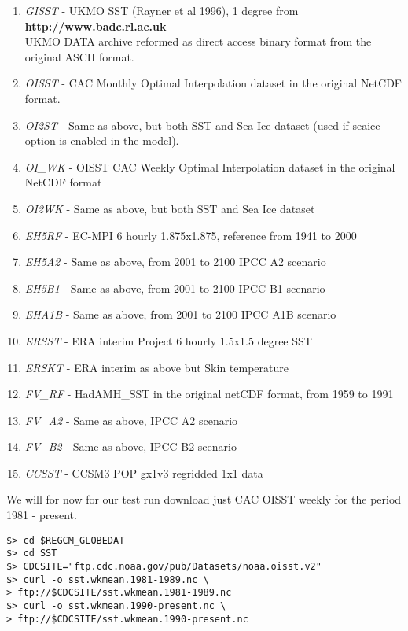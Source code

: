\begin{enumerate}
\item {\em GISST} - UKMO SST (Rayner et al 1996), 1 degree from \\
{\bf http://www.badc.rl.ac.uk} \\ UKMO DATA archive reformed as direct access
binary format from the original ASCII format.
\item {\em OISST} - CAC Monthly Optimal Interpolation dataset in the original 
NetCDF format.
\item {\em OI2ST} - Same as above, but both SST and Sea Ice dataset (used if
seaice option is enabled in the model).
\item {\em OI\_WK} - OISST CAC Weekly Optimal Interpolation dataset in the
original NetCDF format
\item {\em OI2WK} - Same as above, but both SST and Sea Ice dataset
\item {\em EH5RF} - EC-MPI 6 hourly 1.875x1.875, reference from 1941 to 2000
\item {\em EH5A2} - Same as above, from 2001 to 2100 IPCC A2 scenario
\item {\em EH5B1} - Same as above, from 2001 to 2100 IPCC B1 scenario
\item {\em EHA1B} - Same as above, from 2001 to 2100 IPCC A1B scenario
\item {\em ERSST} - ERA interim Project 6 hourly 1.5x1.5 degree SST
\item {\em ERSKT} - ERA interim as above but Skin temperature
\item {\em FV\_RF} - HadAMH\_SST in the original netCDF format, from 1959
to 1991
\item {\em FV\_A2} - Same as above, IPCC A2 scenario
\item {\em FV\_B2} - Same as above, IPCC B2 scenario 
\item {\em CCSST} - CCSM3 POP gx1v3 regridded 1x1 data
\end{enumerate}

We will for now for our test run download just CAC OISST weekly for the
period 1981 - present.

\begin{Verbatim}
$> cd $REGCM_GLOBEDAT
$> cd SST
$> CDCSITE="ftp.cdc.noaa.gov/pub/Datasets/noaa.oisst.v2"
$> curl -o sst.wkmean.1981-1989.nc \
> ftp://$CDCSITE/sst.wkmean.1981-1989.nc
$> curl -o sst.wkmean.1990-present.nc \
> ftp://$CDCSITE/sst.wkmean.1990-present.nc
\end{Verbatim}

